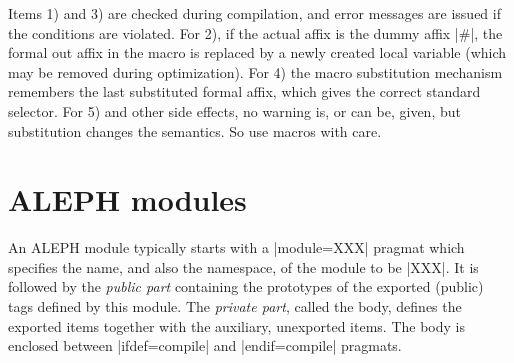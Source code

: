 \documentclass{article}
\newcommand\A{\textsf{ALEPH}}
\gdef\mkbold{\catcode`\'\active\def'##1'{\char39\relax{\bt##1}\char39\relax}%
\catcode`\,\active\def,{\char44\relax}%
\catcode`\<\active\def<{\char60\relax}%
\catcode`\>\active\def>{\char62\relax}%
\catcode`\$=12\catcode`\#=12\catcode`\^=12%
\catcode`\ \active\def {\nobreakspace}}}
\newenvironment{program}{%
\ignorespaces
\par\vskip 3pt plus 2pt minus 2pt\par
\parindent=0pt\tt
\catcode`\$=12\catcode`\^=12
\mkbold
\obeylines
\leftskip \programindent
\baselineskip=0.9\baselineskip
\everypar\expandafter{\the\everypar\unpenalty}%
}{\vskip 2pt plus 2pt minus 2pt\par}
{\catcode`\'=\active\catcode`\ =\active\catcode`\,=\active\catcode`\_=\active%
\catcode`\$=12\catcode`\^=12\catcode`\|=\active\catcode`\<\active\catcode`\>\active%
\gdef\pp#1{\relax\begingroup
\catcode`\$=12\catcode`\~=12\catcode`\^=12%
\catcode`\|\active\let|\endgroup
\catcode`\ \active\def {\space}%
\catcode`\'\active\def'##1'{\char39\relax{\bt##1}\char39\relax}%
\catcode`\_\active\def_{\kern 0.03em\rule{0.3em}{1pt}\kern 0.03em}%
\catcode`\<\active\def<{\char60\relax}%
\catcode`\>\active\def>{\char62\relax}%
\catcode`\#=12\catcode`\^=12%
\tt
}%
}
{\catcode`\[=\active\catcode`\]=\active\catcode`\*=\active%
\gdef\mkoptions{\catcode`\[\active\def[{\kern0.05em\char91\kern0.12em\relax}%
\catcode`\]\active\def]{\kern0.1em\char93\kern0.05em\relax}%
\catcode`\*\active\def*{\kern 0.05em\raisebox{-0.5ex}{\char42}\relax}
}}%
\begin{document}
Items 1) and 3) are checked during compilation, and error messages are
issued if the conditions are violated. For 2), if the actual affix is the dummy
affix \pp|\#|, the formal out affix in the macro is replaced by a newly
created local variable
(which may be removed during optimization). For 4) the macro substitution
mechanism remembers the last substituted formal affix, which gives the
correct standard selector. For 5) and other side effects, no warning is, or
can be, given, but substitution changes the semantics. So use macros with
care.


\section{\A{} modules}\label{section:module}

An \A{} module typically starts with a \pp|module=XXX| pragmat which
specifies the name, and also the namespace, of the module to be \pp|XXX|. It
is followed by the \emph{public part} containing the prototypes of the
exported (public) tags defined by this module. The \emph{private part},
called the body, defines the exported items together with the auxiliary,
unexported items. The body is enclosed between \pp|ifdef=compile| and
\pp|endif=compile| pragmats.
\end{document}
